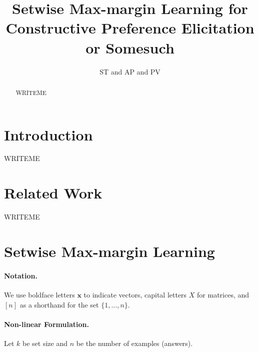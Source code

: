 \documentclass{article}
\title{Setwise Max-margin Learning for Constructive Preference Elicitation or Somesuch}
\author{ST and AP and PV}
\renewcommand\[{\begin{equation}}
\renewcommand\]{\end{equation}}
\newcommand{\vecvar}[1]{\ensuremath{\boldsymbol{#1}}}
\newcommand{\vx}{\vecvar{x}}
\begin{document}
\maketitle

\begin{abstract}
WRITEME
\end{abstract}

\section{Introduction}

WRITEME

\section{Related Work}

WRITEME

\section{Setwise Max-margin Learning}

\paragraph{Notation.} We use boldface letters $\vx$ to indicate vectors,
capital letters $X$ for matrices, and $[n]$ as a shorthand for the set $\{1, \ldots, n\}$.

\paragraph{Non-linear Formulation.}

Let $k$ be set size and $n$ be the number of examples (answers).
\end{document}
